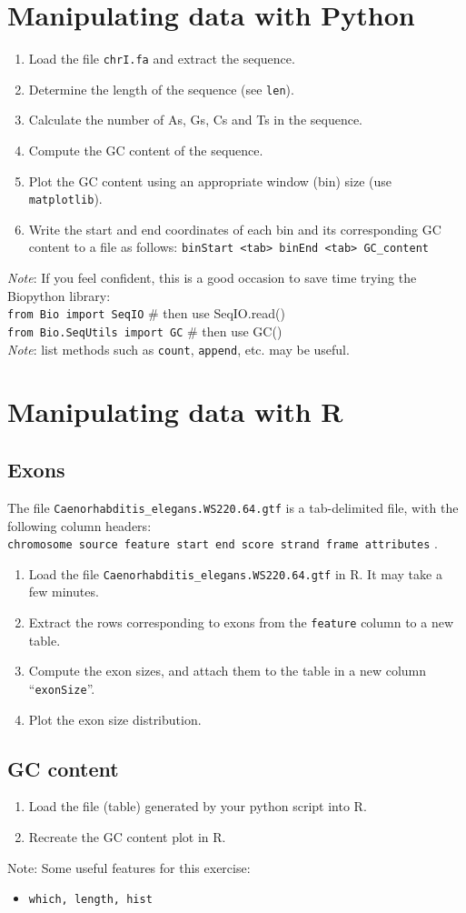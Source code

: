 \documentclass[a4paper,11pt]{article}
\begin{document}
\newpage

\section{Manipulating data with Python}
\begin{enumerate}
\item Load the file \texttt{chrI.fa} and extract the sequence.
\item Determine the length of the sequence (see \texttt{len}).
\item Calculate the number of As, Gs, Cs and Ts in the sequence.
\item Compute the GC content of the sequence.
\item Plot the GC content using an appropriate window (bin) size (use \texttt{matplotlib}).
\item Write the start and end coordinates of each bin and its corresponding GC content to a file as follows:
\texttt {binStart <tab> binEnd <tab> GC\_content}
\end{enumerate}
\textit{Note}: If you feel confident, this is a good occasion to save time trying the Biopython library: \\
\texttt{from Bio import SeqIO} \# then use SeqIO.read()\\
\texttt{from Bio.SeqUtils import GC} \# then use GC() \\
\textit{Note}: list methods such as \texttt{count}, \texttt{append}, etc. may be useful.


\section{Manipulating data with R}
\subsection{Exons}
The file \texttt{Caenorhabditis\_elegans.WS220.64.gtf} is a tab-delimited file, with the following column headers: \\
\texttt {chromosome source feature start end score strand frame attributes} .
\begin{enumerate}
\item Load the file \texttt{Caenorhabditis\_elegans.WS220.64.gtf} in R. It may take a few minutes.
\item Extract the rows corresponding to exons from the \texttt{feature} column to a new table.
\item Compute the exon sizes, and attach them to the table in a new column ``\texttt{exonSize}''.
\item Plot the exon size distribution.
\end{enumerate}

\subsection{GC content}
\begin{enumerate}
\item Load the file (table) generated by your python script into R.
\item Recreate the GC content plot in R.
\end{enumerate}
\noindent
Note: Some useful features for this exercise:
\begin{itemize}
\item \texttt{which, length, hist}
\end{itemize}
\end{document}
